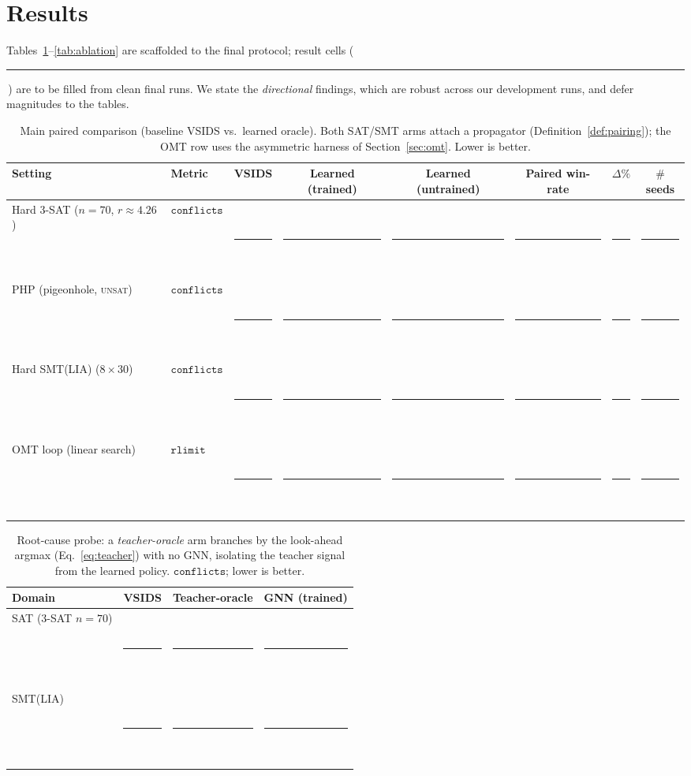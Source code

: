 \documentclass[letterpaper]{article} %
\theoremstyle{definition}
\theoremstyle{plain}
\theoremstyle{remark}
\newcommand{\blank}{\,\rule[-.1ex]{2.2em}{0.4pt}\,} %
\newcommand{\confl}{\texttt{conflicts}}
\newcommand{\rlimit}{\texttt{rlimit}}
\begin{document}
\section{Results}
\label{sec:results}

Tables~\ref{tab:main}--\ref{tab:ablation} are scaffolded to the final
protocol; result cells (\blank) are to be filled from clean final runs. We
state the \emph{directional} findings, which are robust across our
development runs, and defer magnitudes to the tables.

\begin{table}[t]
\centering
\small
\begin{tabular}{@{}llcccccc@{}}
\toprule
Setting & Metric & VSIDS & Learned (trained) & Learned (untrained) & Paired win-rate & $\Delta\%$ & $\#$seeds \\
\midrule
Hard 3-SAT ($n{=}70$, $r{\approx}4.26$) & $\confl$ & \blank & \blank & \blank & \blank & \blank & \blank \\
PHP (pigeonhole, \textsc{unsat})        & $\confl$ & \blank & \blank & \blank & \blank & \blank & \blank \\
Hard SMT(LIA) ($8{\times}30$)           & $\confl$ & \blank & \blank & \blank & \blank & \blank & \blank \\
OMT loop (linear search)                & $\rlimit$ & \blank & \blank & \blank & \blank & \blank & \blank \\
\bottomrule
\end{tabular}
\caption{Main paired comparison (baseline VSIDS vs.\ learned oracle). Both
SAT/SMT arms attach a propagator (Definition~\ref{def:pairing}); the OMT row
uses the asymmetric harness of Section~\ref{sec:omt}. Lower is better.}
\label{tab:main}
\end{table}

\begin{table}[t]
\centering
\small
\begin{tabular}{@{}lccc@{}}
\toprule
Domain & VSIDS & Teacher-oracle & GNN (trained) \\
\midrule
SAT (3-SAT $n{=}70$)  & \blank & \blank & \blank \\
SMT(LIA)              & \blank & \blank & \blank \\
\bottomrule
\end{tabular}
\caption{Root-cause probe: a \emph{teacher-oracle} arm branches by the
look-ahead argmax (Eq.~\ref{eq:teacher}) with no GNN, isolating the teacher
signal from the learned policy. $\confl$; lower is better.}
\label{tab:oracle}
\end{table}
\end{document}
